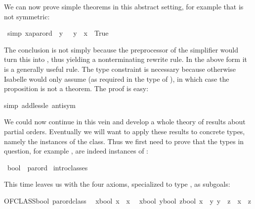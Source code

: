 \begin{isabellebody}
\begin{isamarkuptext}
We can now prove simple theorems in this abstract setting, for example
that \isa{{\isacharless}{\isacharless}} is not symmetric:%
\end{isamarkuptext}%
\ {\isacharbrackleft}simp{\isacharbrackright}{\isacharcolon}\ {\isachardoublequote}{\isacharparenleft}x{\isacharcolon}{\isacharcolon}{\isacharprime}a{\isacharcolon}{\isacharcolon}parord{\isacharparenright}\ {\isacharless}{\isacharless}\ y\ {\isasymLongrightarrow}\ {\isacharparenleft}{\isasymnot}\ y\ {\isacharless}{\isacharless}\ x{\isacharparenright}\ {\isacharequal}\ True{\isachardoublequote}%
\begin{isamarkuptxt}%
\noindent
The conclusion is not simply  because the preprocessor
of the simplifier would turn this into , thus yielding
a nonterminating rewrite rule. In the above form it is a generally useful
rule.
The type constraint is necessary because otherwise Isabelle would only assume
 (as required in the type of \isa{{\isacharless}{\isacharless}}), in
which case the proposition is not a theorem.  The proof is easy:%
\end{isamarkuptxt}%
simp\ add{\isacharcolon}less{\isacharunderscore}le\ antisym{\isacharparenright}%
\begin{isamarkuptext}%
We could now continue in this vein and develop a whole theory of
results about partial orders. Eventually we will want to apply these results
to concrete types, namely the instances of the class. Thus we first need to
prove that the types in question, for example , are indeed
instances of :%
\end{isamarkuptext}%
\ bool\ {\isacharcolon}{\isacharcolon}\ parord\isanewline
{}\ intro{\isacharunderscore}classes%
\begin{isamarkuptxt}%
\noindent
This time  leaves us with the four axioms,
specialized to type , as subgoals:
\begin{isabelle}%
OFCLASS{\isacharparenleft}bool{\isacharcomma}\ parord{\isacharunderscore}class{\isacharparenright}\isanewline
\ {}{\isachardot}\ {\isasymAnd}x{\isasymColon}bool{\isachardot}\ x\ {\isacharless}{\isacharless}{\isacharequal}\ x\isanewline
\ {}{\isachardot}\ {\isasymAnd}{\isacharparenleft}x{\isasymColon}bool{\isacharparenright}\ {\isacharparenleft}y{\isasymColon}bool{\isacharparenright}\ z{\isasymColon}bool{\isachardot}\ {\isasymlbrakk}x\ {\isacharless}{\isacharless}{\isacharequal}\ y{\isacharsemicolon}\ y\ {\isacharless}{\isacharless}{\isacharequal}\ z{\isasymrbrakk}\ {\isasymLongrightarrow}\ x\ {\isacharless}{\isacharless}{\isacharequal}\ z\isanewline

\end{isabelle}
\end{isamarkuptxt}
\end{isabellebody}
